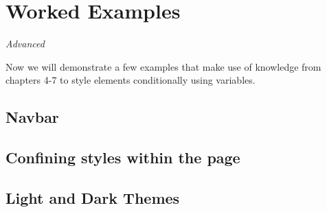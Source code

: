 \chapter{Worked Examples}

\textit{Advanced}
\vspace{6mm}

Now we will demonstrate a few examples that make use of knowledge from chapters 4-7 to style elements conditionally using variables.

\section{Navbar}

\section{Confining styles within the page}
\label{sec:confinestyles}

\section{Light and Dark Themes}
